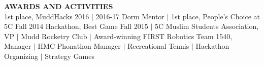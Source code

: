 \documentclass[10.75pt]{article}
\newcommand{\vb}{ $\mid$ }
\newcommand{\sectionNL}{\\[2pt]}
\newcommand{\customtab}{$\hspace{10pt} - \hspace{2pt}$}
\begin{document}

\begin{flushleft}
{\textbf{AWARDS AND ACTIVITIES}} \sectionNL
	1st place, MuddHacks 2016 \vb 2016-17 Dorm Mentor \vb 1st place, People's Choice at 5C Fall 2014 Hackathon, Best Game Fall 2015 \vb 5C Muslim Students Association, VP \vb Mudd Rocketry Club \vb Award-winning FIRST Robotics Team 1540, Manager \vb HMC Phonathon Manager \vb Recreational Tennis \vb Hackathon Organizing \vb Strategy Games

\end{flushleft} 
\end{document}
